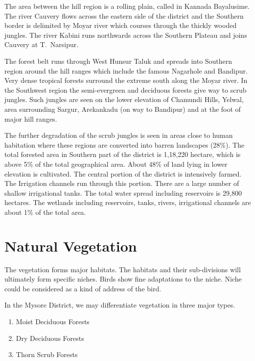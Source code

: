 The area between the hill region is a rolling plain, called 
in Kannada Bayalusime. The river Cauvery flows across the eastern 
side of the district and the Southern border is delimited by 
Moyar river which courses through the thickly wooded jungles. The 
river Kabini runs northwards across the Southern Plateau and 
joins Cauvery at T.\ Narsipur. 

The forest belt runs through West Hunsur Taluk and spreads 
into Southern region around the hill ranges which include the 
famous Nagarhole and Bandipur. Very dense tropical forests surround 
the extreme south along the Moyar river. In the Southwest 
region the semi-evergreen and deciduous forests give way to 
scrub jungles. Such jungles are seen on the lower elevation of 
Chamundi Hills, Yelwal, area surrounding Sargur, Arekankadu (on 
way to Bandipur) and at the foot of major hill ranges. 

The further degradation of the scrub jungles is seen in 
areas close to human habitation where these regions are converted 
into barren landscapes (28\%). The total forested area in Southern 
part of the district is 1,18,220 hectare, which is above 5\% of 
the total geographical area. About 48\% of land lying in lower 
elevation is cultivated. The central portion of the district is 
intensively farmed. The Irrigation channels run through this 
portion. There are a large number of shallow irrigational tanks. 
The total water spread including reservoirs is 29,800 hectares. 
The wetlands including reservoirs, tanks, rivers, irrigational 
channels are about 1\% of the total area. 

\chapter{Natural Vegetation}

The vegetation forms major habitats. The habitats and their 
sub-divisions will ultimately form specific niches. Birds show 
fine adaptations to the niche. Niche could be considered as a 
kind of address of the bird. 

In the Mysore District, we may differentiate vegetation in 
three major types. 
\begin{enumerate}
\itemsep=2pt
\item Moist Deciduous Forests 

\item Dry Deciduous Forests 

\item Thorn Scrub Forests 
\end{enumerate} 

